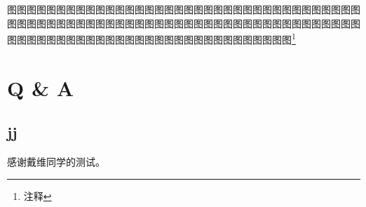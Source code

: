 \documentclass{LZU}
\begin{document}
\printbibliography[title={参考文献},heading=bibintoc]
\Appendix
图图图图图图图图图图图图图图图图图图图图图图图图图图图图图图图图图图图图图图图图图图图图图图图图图图图图图图图图图图图图图图图图图图图图图图图图图图图图图图图图图图图图图图图图图图图图图图图图图图图图图\footnote{注释}
\section{Q \& A}
\subsection{jj}
\Thanks
感谢戴维同学的测试。
\Grade
\end{document}
